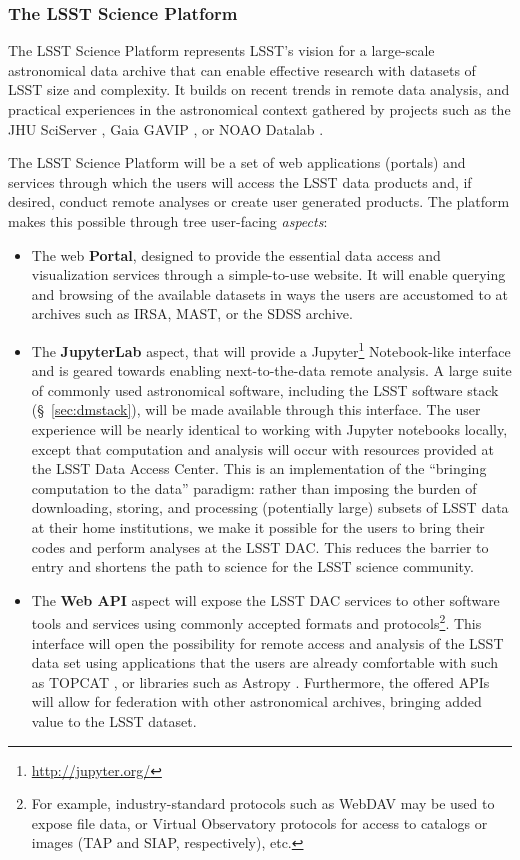 \subsubsection{The LSST Science Platform}
\label{sec:lsp}

The LSST Science Platform \citep{LSP} represents LSST's vision for a
large-scale astronomical data archive that can enable effective research
with datasets of LSST size and complexity.  It builds on recent trends in
remote data analysis, and practical experiences in the astronomical context
gathered by projects such as the JHU
SciServer \citep{sciserver}, Gaia GAVIP \citep{gavip}, or NOAO Datalab \citep{datalab}.

The LSST Science Platform will be a set of web applications (portals) and
services through which the users will access the LSST data products and, if
desired, conduct remote analyses or create user generated products.  The
platform makes this possible through tree user-facing {\em aspects}:
%
\begin{itemize}

\item The web {\bf Portal}, designed to provide the essential data access and
visualization services through a simple-to-use website.  It will enable
querying and browsing of the available datasets in ways the users are
accustomed to at archives such as IRSA, MAST, or the SDSS archive.

\item The {\bf JupyterLab} aspect, that will provide a
Jupyter\footnote{\url{http://jupyter.org/}} Notebook-like
interface and is geared towards enabling next-to-the-data remote analysis.
A large suite of commonly used astronomical software, including the LSST
software stack (\S~\ref{sec:dmstack}), will be made available through this
interface.  The user experience will be nearly identical to working with
Jupyter notebooks locally, except that computation and analysis will occur
with resources provided at the LSST Data Access Center.  This is an
implementation of the ``bringing computation to the data'' paradigm: rather
than imposing the burden of downloading, storing, and processing
(potentially large) subsets of LSST data at their home institutions, we make
it possible for the users to bring their codes and perform analyses at the
LSST DAC.  This reduces the barrier to entry and shortens the path to
science for the LSST science community.

\item The {\bf Web API} aspect will expose the LSST DAC services to other
software tools and services using commonly accepted formats and protocols\footnote{For
example, industry-standard protocols such as WebDAV may be used to expose
file data, or Virtual Observatory protocols for access to catalogs or images
(TAP and SIAP, respectively), etc.}.  This interface will open the
possibility for remote access and analysis of the LSST data set using
applications that the users are already comfortable with such as
TOPCAT \citep{topcat}, or libraries such as Astropy \citep{astropy}.  Furthermore, the offered APIs will allow
for federation with other astronomical archives, bringing added value to the
LSST dataset.
\end{itemize}

